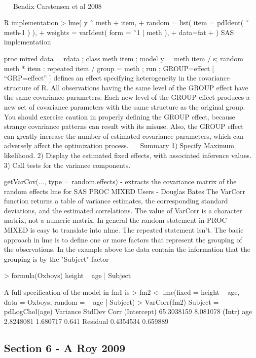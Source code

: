  



 
Bendix Carstensen et al 2008

R implementation
> lme( y ˜ meth + item,
+ random = list( item = pdIdent( ˜ meth-1 ) ),
+ weights = varIdent( form = ˜1 | meth ),
+ data=fat
+ )
SAS implementation

proc mixed data = rdata ;
class meth item ;
model y = meth item / s;
random meth * item ;
repeated item / group = meth ;
run ;
GROUP=effect	[ “GRP=effect” ]
defines an effect specifying heterogeneity in the covariance structure of R. 
All observations having the same level of the GROUP effect have the same covariance parameters. 
Each new level of the GROUP effect produces a new set of covariance parameters with the same structure as the original group. 
You should exercise caution in properly defining the GROUP effect, because strange covariance patterns can result with its misuse. Also, the GROUP effect can greatly increase the number of estimated covariance parameters, which can adversely affect the optimization process. 
 
Summary  
1)	Specify Maximum likelihood.
2)	Display the estimated fixed effects, with associated inference values.
3)	Call tests for the variance components.

getVarCov(..., type = random.effects) - extracts the covariance matrix of the random effects
lme for SAS PROC MIXED Users - Douglas Bates
The VarCorr function returns a table of variance estimates, the
corresponding standard deviations, and the estimated correlations.
The value of VarCorr is a character matrix, not a numeric matrix. 
In general the random statement in PROC MIXED is
easy to translate into nlme.  The repeated statement isn't.
The basic approach in lme is to define one or more factors that represent the grouping of the observations.  In the example above the data contain the information that the grouping is by the "Subject"
factor

 > formula(Oxboys)
 height ~ age | Subject

A full specification of the model in fm1 is
 > fm2 <- lme(fixed = height ~ age, data = Oxboys, random = ~ age | Subject)
 > VarCorr(fm2)
 Subject = pdLogChol(age) 
             Variance   StdDev   Corr  
 (Intercept) 65.3038159 8.081078 (Intr)
 age          2.8248081 1.680717 0.641 
 Residual     0.4354534 0.659889   

\newpage
\subsection*{Section 6  -  A Roy 2009}

